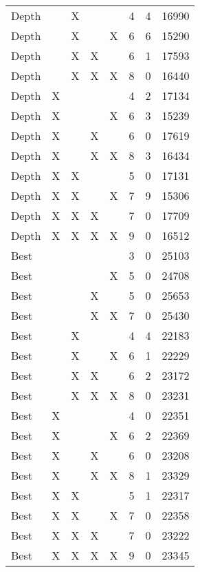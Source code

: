 \begin{tabular}{lllllrrr}
   Depth &    &  X &    &    &        4 &       4 &      16990 \\
   Depth &    &  X &    &  X &        6 &       6 &      15290 \\
   Depth &    &  X &  X &    &        6 &       1 &      17593 \\
   Depth &    &  X &  X &  X &        8 &       0 &      16440 \\
   Depth &  X &    &    &    &        4 &       2 &      17134 \\
   Depth &  X &    &    &  X &        6 &       3 &      15239 \\
   Depth &  X &    &  X &    &        6 &       0 &      17619 \\
   Depth &  X &    &  X &  X &        8 &       3 &      16434 \\
   Depth &  X &  X &    &    &        5 &       0 &      17131 \\
   Depth &  X &  X &    &  X &        7 &       9 &      15306 \\
   Depth &  X &  X &  X &    &        7 &       0 &      17709 \\
   Depth &  X &  X &  X &  X &        9 &       0 &      16512 \\
    Best &    &    &    &    &        3 &       0 &      25103 \\
    Best &    &    &    &  X &        5 &       0 &      24708 \\
    Best &    &    &  X &    &        5 &       0 &      25653 \\
    Best &    &    &  X &  X &        7 &       0 &      25430 \\
    Best &    &  X &    &    &        4 &       4 &      22183 \\
    Best &    &  X &    &  X &        6 &       1 &      22229 \\
    Best &    &  X &  X &    &        6 &       2 &      23172 \\
    Best &    &  X &  X &  X &        8 &       0 &      23231 \\
    Best &  X &    &    &    &        4 &       0 &      22351 \\
    Best &  X &    &    &  X &        6 &       2 &      22369 \\
    Best &  X &    &  X &    &        6 &       0 &      23208 \\
    Best &  X &    &  X &  X &        8 &       1 &      23329 \\
    Best &  X &  X &    &    &        5 &       1 &      22317 \\
    Best &  X &  X &    &  X &        7 &       0 &      22358 \\
    Best &  X &  X &  X &    &        7 &       0 &      23222 \\
    Best &  X &  X &  X &  X &        9 &       0 &      23345 \\
\bottomrule
\end{tabular}
\unskip